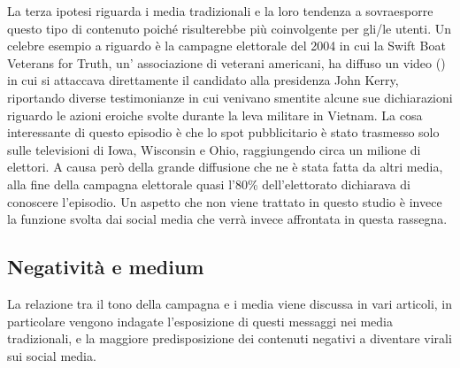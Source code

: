 La terza ipotesi riguarda i media tradizionali e la loro tendenza a sovraesporre questo tipo di contenuto poiché risulterebbe più coinvolgente per gli/le utenti. Un celebre esempio a riguardo è la campagne elettorale del 2004 in cui la  Swift Boat Veterans for Truth, un' associazione di veterani americani, ha diffuso un video () in cui si attaccava direttamente il candidato alla presidenza John Kerry, riportando diverse testimonianze in cui venivano smentite alcune sue dichiarazioni riguardo le azioni eroiche svolte durante la leva militare in Vietnam. La cosa interessante di questo episodio è che lo spot pubblicitario è stato trasmesso solo sulle televisioni di Iowa, Wisconsin e Ohio, raggiungendo circa un milione di elettori. A causa però della grande diffusione che ne è stata fatta da altri media, alla fine della campagna elettorale quasi l'80\% dell'elettorato dichiarava di conoscere l'episodio.
Un aspetto che non viene trattato in questo studio è invece la funzione svolta dai social media che verrà invece affrontata in questa rassegna.

\subsection{Negatività e medium}
La relazione tra il tono della campagna e i media viene discussa in vari articoli, in particolare vengono indagate l'esposizione di questi messaggi nei media tradizionali, e la maggiore predisposizione dei contenuti negativi a diventare virali sui social media.

